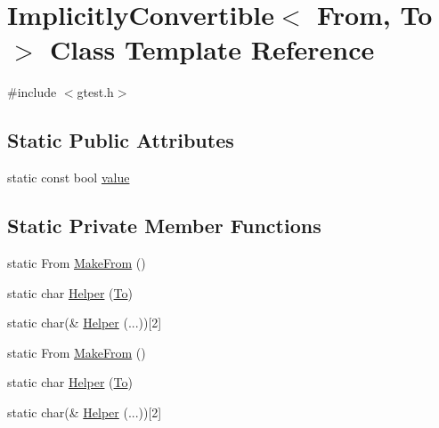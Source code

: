 \hypertarget{classtesting_1_1internal_1_1ImplicitlyConvertible}{\section{\-Implicitly\-Convertible$<$ \-From, \-To $>$ \-Class \-Template \-Reference}
\label{d1/d75/classtesting_1_1internal_1_1ImplicitlyConvertible}
}


{\ttfamily \#include $<$gtest.\-h$>$}

\subsection*{\-Static \-Public \-Attributes}
\begin{DoxyCompactItemize}
\item 
static const bool \hyperlink{classtesting_1_1internal_1_1ImplicitlyConvertible_a11ddd051208250c32dc4985abcafa86d}{value}
\end{DoxyCompactItemize}
\subsection*{\-Static \-Private \-Member \-Functions}
\begin{DoxyCompactItemize}
\item 
static \-From \hyperlink{classtesting_1_1internal_1_1ImplicitlyConvertible_a2b3b3eb9a68f17bdb0bfa90c39e1d638}{\-Make\-From} ()
\item 
static char \hyperlink{classtesting_1_1internal_1_1ImplicitlyConvertible_aa7f6464439603a4d73da0e75bc280e2f}{\-Helper} (\hyperlink{classtesting_1_1internal_1_1To}{\-To})
\item 
static char(\& \hyperlink{classtesting_1_1internal_1_1ImplicitlyConvertible_a9044039e84654d2d043aa732bf8609b6}{\-Helper} (...))\mbox{[}2\mbox{]}
\item 
static \-From \hyperlink{classtesting_1_1internal_1_1ImplicitlyConvertible_a2b3b3eb9a68f17bdb0bfa90c39e1d638}{\-Make\-From} ()
\item 
static char \hyperlink{classtesting_1_1internal_1_1ImplicitlyConvertible_aa7f6464439603a4d73da0e75bc280e2f}{\-Helper} (\hyperlink{classtesting_1_1internal_1_1To}{\-To})
\item 
static char(\& \hyperlink{classtesting_1_1internal_1_1ImplicitlyConvertible_a9044039e84654d2d043aa732bf8609b6}{\-Helper} (...))\mbox{[}2\mbox{]}
\end{DoxyCompactItemize}



